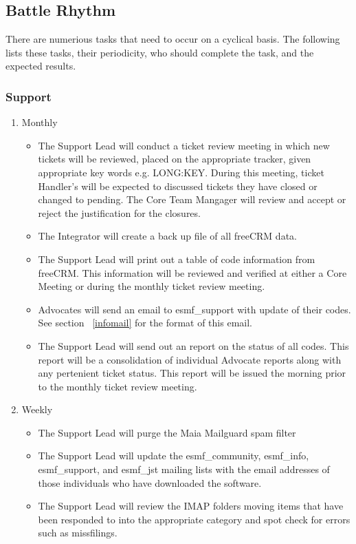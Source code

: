 \subsection{Battle Rhythm}
\label{battle}
There are numerious tasks that need to occur on a cyclical basis. The following lists these tasks, their periodicity, who should complete the task, and the expected results.

\subsubsection{Support}
\begin{enumerate}
\item Monthly
  \begin{itemize}
  \item The Support Lead will conduct a ticket review meeting in which new tickets will be reviewed, placed on the appropriate tracker, given appropriate key words e.g. LONG:KEY. During this meeting, ticket Handler's will be expected to discussed tickets they have closed or changed to pending. The Core Team Mangager will review and accept or reject the justification for the closures.
   \item The Integrator will create a back up file of all freeCRM data.
   \item The Support Lead will print out a table of code information from freeCRM. This information will be reviewed and verified at either a Core Meeting or during the monthly ticket review meeting. 
   \item Advocates will send an email to esmf\_support with update of their codes. See section ~\ref{infomail} for the format of this email.
   \item The Support Lead will send out an report on the status of all codes. This report will be a consolidation of individual Advocate reports along with any pertenient ticket status. This report will be issued the morning prior to the monthly ticket review meeting. 
  \end{itemize}

\item Weekly
  \begin{itemize}
  \item The Support Lead will purge the Maia Mailguard spam filter
  \item The Support Lead will update the esmf\_community, esmf\_info, esmf\_support, and esmf\_jst mailing lists with the email addresses of those individuals who have downloaded the software.
  \item The Support Lead will review the IMAP folders moving items that have been responded to into the appropriate category and spot check for errors such as missfilings.
  \end{itemize}

\end{enumerate}  
 
